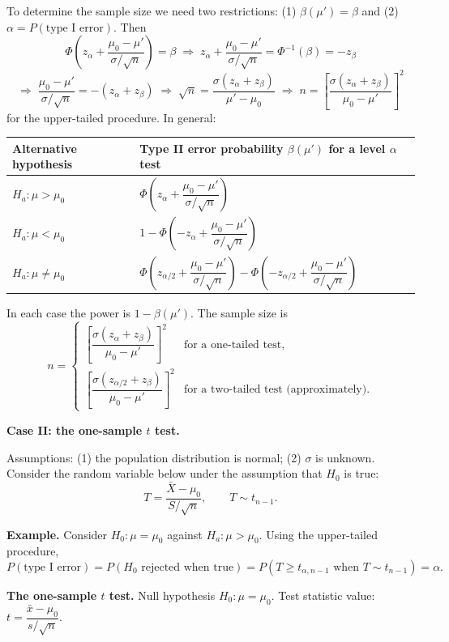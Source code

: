 To determine the sample size we need two restrictions: (1) $\beta(\mu')=\beta$ and
(2) $\alpha = P(\text{type I error})$. Then
\[
\Phi\!\left(z_\alpha + \frac{\mu_0-\mu'}{\sigma/\sqrt{n}}\right)=\beta
\;\Rightarrow\; z_\alpha + \frac{\mu_0-\mu'}{\sigma/\sqrt{n}} = \Phi^{-1}(\beta) = -z_\beta
\]
\[
\Rightarrow\; \frac{\mu_0-\mu'}{\sigma/\sqrt{n}} = -(z_\alpha+z_\beta)
\;\Rightarrow\; \sqrt{n} = \frac{\sigma(z_\alpha+z_\beta)}{\mu'-\mu_0}
\;\Rightarrow\; n = \left[\frac{\sigma(z_\alpha+z_\beta)}{\mu_0-\mu'}\right]^2
\]
for the upper-tailed procedure. In general:

\begin{center}
\begin{tabular}{ll}
\toprule
Alternative hypothesis & Type II error probability $\beta(\mu')$ for a level $\alpha$ test\\
\midrule
$H_a:\mu>\mu_0$   & $\Phi\!\left(z_\alpha + \dfrac{\mu_0-\mu'}{\sigma/\sqrt{n}}\right)$\\[2ex]
$H_a:\mu<\mu_0$   & $1-\Phi\!\left(-z_\alpha + \dfrac{\mu_0-\mu'}{\sigma/\sqrt{n}}\right)$\\[2ex]
$H_a:\mu\ne\mu_0$ & $\Phi\!\left(z_{\alpha/2} + \dfrac{\mu_0-\mu'}{\sigma/\sqrt{n}}\right) - \Phi\!\left(-z_{\alpha/2} + \dfrac{\mu_0-\mu'}{\sigma/\sqrt{n}}\right)$\\
\bottomrule
\end{tabular}
\end{center}
In each case the power is $1-\beta(\mu')$. The sample size is
\[
n = \begin{cases}
\left[\dfrac{\sigma(z_\alpha+z_\beta)}{\mu_0-\mu'}\right]^2 & \text{for a one-tailed test},\\[3ex]
\left[\dfrac{\sigma(z_{\alpha/2}+z_\beta)}{\mu_0-\mu'}\right]^2 & \text{for a two-tailed test (approximately)}.
\end{cases}
\]

\textbf{Case II: the one-sample $t$ test.}

Assumptions: (1) the population distribution is normal; (2) $\sigma$ is unknown.
Consider the random variable below under the assumption that $H_0$ is true:
\[
T = \frac{\bar{X}-\mu_0}{S/\sqrt{n}}, \qquad T\sim t_{n-1}.
\]

\textbf{Example.} Consider $H_0:\mu=\mu_0$ against $H_a:\mu>\mu_0$. Using the upper-tailed procedure,
\[
P(\text{type I error}) = P(H_0 \text{ rejected when true}) = P(T\ge t_{\alpha,n-1} \text{ when } T\sim t_{n-1}) = \alpha .
\]

\textbf{The one-sample $t$ test.}
Null hypothesis $H_0:\mu=\mu_0$. Test statistic value: $t = \dfrac{\bar{x}-\mu_0}{s/\sqrt{n}}$.


